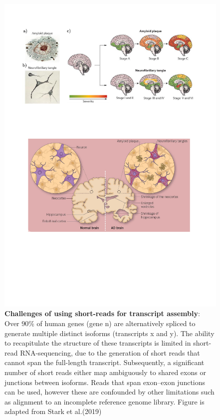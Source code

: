 \begin{landscape}
	\begin{figure}[htp]
		\centering
		\includegraphics[page=10,trim={0 19cm 2cm 1cm},clip, scale = 1]{Figures/Introduction_Figures.pdf}
		\captionsetup{width=1.2\textwidth}
		\caption[Challenges of using short-reads for transcript assembly]%
		{\textbf{Challenges of using short-reads for transcript assembly}: Over 90\% of human genes (gene n) are alternatively spliced to generate multiple distinct isoforms (transcripts x and y). The ability to recapitulate the structure of these transcripts is limited in short-read RNA-sequencing, due to the generation of short reads that cannot span the full-length transcript. Subsequently, a significant number of short reads either map ambiguously to shared exons or junctions between isoforms. Reads that span exon–exon junctions can be used, however these are confounded by other limitations such as alignment to an incomplete reference genome library. Figure is adapted from Stark et al.(2019) \cite{Stark2019}}
		\label{fig:rna_seq_limitations}
	\end{figure}
\end{landscape}


